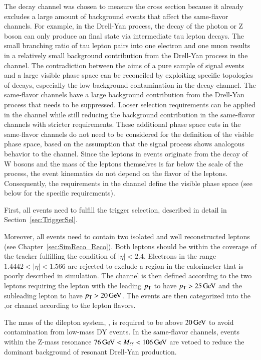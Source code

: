 The \emu decay channel was chosen to measure the \ttbar cross section because it already excludes a large amount of background events that affect the same-flavor channels.
For example, in the Drell-Yan process, the decay of the photon or Z boson can only produce an \emu final state via intermediate tau lepton decays. The small branching ratio of tau lepton pairs into one electron and one muon results
in a relatively small background contribution from the Drell-Yan process in the \emu channel.
The contradiction between the aims of a pure sample of signal events and a large visible phase space can be reconciled by exploiting specific topologies of \ttbar decays, especially the low background contamination in the \emu decay channel. The same-flavor channels have a large background contribution from the Drell-Yan process that needs to be suppressed.
Looser selection requirements can be applied in the \emu channel while still reducing the background contribution in the same-flavor channels with stricter requirements.
These additional phase space cuts in the same-flavor channels do not need to be considered for the definition of the visible phase space, based on the assumption that the \ttbar signal process shows analogous behavior to the \emu channel. Since the leptons in \ttbar events originate from the decay of W bosons and the
mass of the leptons themselves is far below the scale of the process, the event kinematics do not depend on the flavor of the leptons.
Consequently, the requirements in the \emu channel define the visible phase space (see below for the specific requirements).

First, all events need to fulfill the trigger selection, described in detail in Section~\ref{sec:TriggerSel}.

Moreover, all events need to contain two isolated and well reconstructed leptons (see Chapter~\ref{sec:SimReco_Reco}).
Both leptons should be within the coverage of the tracker fulfilling the condition of $|\eta| < 2.4$.
Electrons in the range $1.4442<|\eta|<1.566$ are rejected to exclude a region in the calorimeter that is poorly described in simulation.
The channel is then defined according to the two leptons requiring the lepton with the leading $p_{\mathrm{T}}$ to have $p_{\mathrm{T}} > 25 \,\text{Ge\hspace{-.08em}V}$
and the subleading lepton to have $p_{\mathrm{T}} > 20 \,\text{Ge\hspace{-.08em}V}$. 
The events are then categorized into the \mumu,\ee or \mumu channel according to the lepton flavors.

The mass of the dilepton system, \mll, is required to be above $ 20 \,\text{Ge\hspace{-.08em}V}$ to avoid contamination from low-mass DY events.
In the same-flavor channels, events within the Z-mass resonance $76 \,\text{Ge\hspace{-.08em}V} < M_{\ell\ell} <106 \,\text{Ge\hspace{-.08em}V}$ are vetoed to reduce the dominant background of 
resonant Drell-Yan production.

